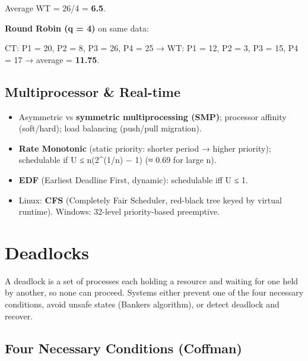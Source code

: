 \endgroup

Average WT = 26/4 = \textbf{6.5}.

\textbf{Round Robin (q = 4)} on same data:



CT: P1 = 20, P2 = 8, P3 = 26, P4 = 25 → WT: P1 = 12, P2 = 3, P3 = 15, P4 = 17 → average = \textbf{11.75}.

\needspace{95pt}

\hypertarget{p2-05--multiprocessor--real-time}{%
\subsection{Multiprocessor \& Real-time}\label{p2-05--multiprocessor--real-time}}

\begin{itemize}
\tightlist
\item
  Asymmetric vs \textbf{symmetric multiprocessing (SMP)}; processor affinity (soft/hard); load balancing (push/pull migration).
\item
  \textbf{Rate Monotonic} (static priority: shorter period → higher priority); schedulable if U ≤ n(2\^{}(1/n) − 1) (≈ 0.69 for large n).
\item
  \textbf{EDF} (Earliest Deadline First, dynamic): schedulable iff U ≤ 1.
\item
  Linux: \textbf{CFS} (Completely Fair Scheduler, red-black tree keyed by virtual runtime). Windows: 32-level priority-based preemptive.
\end{itemize}

\needspace{191pt}

\hypertarget{p2-05--6-deadlocks}{%
\section{Deadlocks}\label{p2-05--6-deadlocks}}

A deadlock is a set of processes each holding a resource and waiting for one held by another, so none can
proceed. Systems either prevent one of the four necessary conditions, avoid unsafe states (Banker\textquotesingle s
algorithm), or detect deadlock and recover.

\needspace{125pt}

\hypertarget{p2-05--four-necessary-conditions-coffman}{%
\subsection{Four Necessary Conditions (Coffman)}\label{p2-05--four-necessary-conditions-coffman}}

